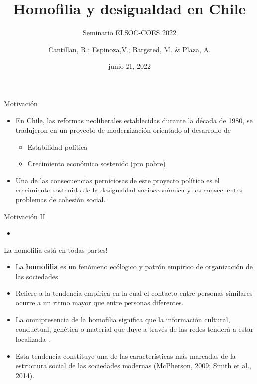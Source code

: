 \documentclass[
  8pt,
  ignorenonframetext,
]{beamer}
\title{Homofilia y desigualdad en Chile}
\subtitle{Seminario ELSOC-COES 2022}
\author{Cantillan, R.; Espinoza,V.; Bargsted, M. \& Plaza, A.}
\date{junio 21, 2022}
\institute{ISUC PUC - COES - redesLab}
\providecommand{\tightlist}{%
  \setlength{\itemsep}{0pt}\setlength{\parskip}{0pt}}
\begin{document}
\frame{\titlepage}

\begin{frame}[allowframebreaks]
  \tableofcontents[hideallsubsections]
\end{frame}
\begin{frame}{Motivación}
\protect\hypertarget{motivaciuxf3n}{}
\begin{itemize}
\item
  En Chile, las reformas neoliberales establecidas durante la década de
  1980, se tradujeron en un proyecto de modernización orientado al
  desarrollo de

  \begin{itemize}
  \tightlist
  \item
    Estabilidad política
  \item
    Crecimiento económico sostenido (pro pobre)
  \end{itemize}
\item
  Una de las consecuencias perniciosas de este proyecto político es el
  crecimiento sostenido de la desigualdad socioeconómica y los
  consecuentes problemas de cohesión social.
\end{itemize}
\end{frame}

\begin{frame}{Motivación II}
\protect\hypertarget{motivaciuxf3n-ii}{}
\begin{itemize}
\tightlist
\item
\end{itemize}
\end{frame}

\begin{frame}{La homofilia está en todas partes!}
\protect\hypertarget{la-homofilia-estuxe1-en-todas-partes}{}
\begin{itemize}
\item
  La \textbf{homofilia} es un fenómeno ecólogico y patrón empírico de
  organización de las sociedades.
\item
  Refiere a la tendencia empírica en la cual el contacto entre personas
  similares ocurre a un ritmo mayor que entre personas diferentes.
\item
  La omnipresencia de la homofilia significa que la información
  cultural, conductual, genética o material que fluye a través de las
  redes tenderá a estar localizada .
\item
  Esta tendencia constituye una de las características más marcadas de
  la estructura social de las sociedades modernas (McPherson, 2009;
  Smith et al., 2014).
\end{itemize}
\end{frame}
\end{document}
